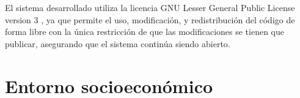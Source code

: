 El sistema desarrollado utiliza la licencia GNU Lesser General Public License
version 3 \parencite{lgpl}, ya que permite el uso, modificación, y
redistribución del código de forma libre con la única restricción de que las
modificaciones se tienen que publicar, asegurando que el sistema continúa siendo
abierto.

\section{Entorno socioeconómico}\label{sec:environment}
